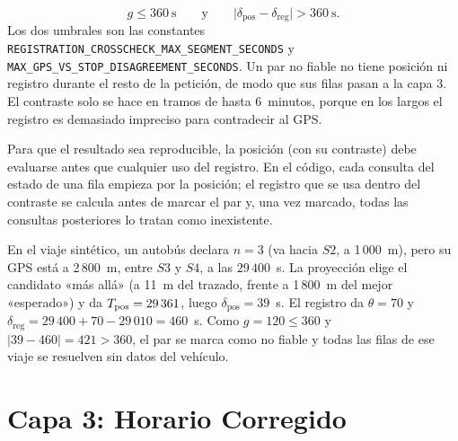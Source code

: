 \begin{equation}
\label{eq:contraste}
g\le360\ \text{s}\qquad\text{y}\qquad\big|\delta_{\mathrm{pos}}-\delta_{\mathrm{reg}}\big|>360\ \text{s}.
\end{equation}
Los dos umbrales son las constantes \texttt{REGISTRATION\_CROSSCHECK\_MAX\_SEGMENT\_SECONDS} y
\texttt{MAX\_GPS\_VS\_STOP\_DISAGREEMENT\_SECONDS}. Un par no
fiable no tiene posición ni registro durante el resto de la petición, de modo que sus filas pasan a la capa 3. El
contraste solo se hace en tramos de hasta 6~minutos, porque en los largos el registro es demasiado impreciso para
contradecir al GPS.

Para que el resultado sea reproducible, la posición (con su contraste) debe evaluarse antes que cualquier uso del
registro. En el código, cada consulta del estado de una fila empieza por la posición; el registro que se usa dentro del
contraste se calcula antes de marcar el par y, una vez marcado, todas las consultas posteriores lo tratan como
inexistente.

\begin{ejemplo}
En el viaje sintético, un autobús declara $n=3$ (va hacia $S2$, a 1\,000~m), pero su GPS está a 2\,800~m, entre $S3$ y
$S4$, a las $29\,400$~s. La proyección elige el candidato «más allá» (a 11~m del trazado, frente a 1\,800~m del mejor
«esperado») y da $T_{\mathrm{pos}}=29\,361$, luego $\delta_{\mathrm{pos}}=39$~s. El registro da $\theta=70$ y
$\delta_{\mathrm{reg}}=29\,400+70-29\,010=460$~s. Como $g=120\le360$ y $|39-460|=421>360$, el par se marca como no
fiable y todas las filas de ese viaje se resuelven sin datos del vehículo.
\end{ejemplo}

\section{Capa 3: Horario Corregido}
\label{sec:capa3}

